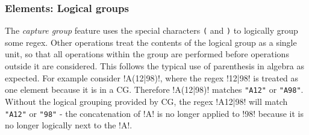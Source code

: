 \subsubsection*{Elements: Logical groups}
\begin{description}  \itemsep -1pt
\item[CG:] The \emph{capture group} feature uses the special characters \verb!(! and \verb!)! to logically group some regex.  Other operations treat the contents of the logical group as a single unit, so that all operations within the group are performed before operations outside it are considered.  This follows the typical use of parenthesis in algebra as expected.  For example consider \cverb!A(12|98)!, where the regex \cverb!12|98! is treated as one element because it is in a CG.  Therefore \cverb!A(12|98)! matches \verb!"A12"! or \verb!"A98"!.  Without the logical grouping provided by CG, the regex \cverb!A12|98! will match \verb!"A12"! or \verb!"98"! - the concatenation of \cverb!A! is no longer applied to \cverb!98! because it is no longer logically next to the \cverb!A!.


\end{description}
